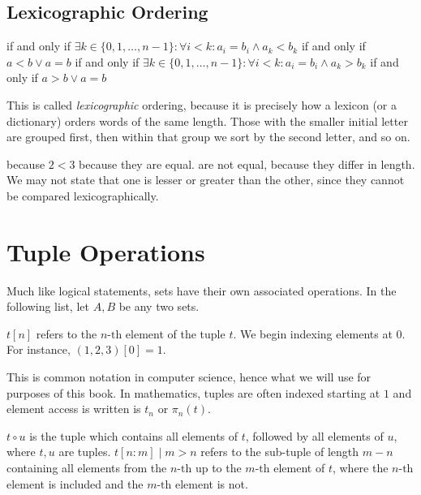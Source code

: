\subsection*{Lexicographic Ordering}
\begin{itemize}
   if and only if
        \(\exists k \in \{0, 1, \dots, n-1\}: \forall i < k: a_{i} = b_{i} \land a_{k} < b_{k}\)
   if and only if \(a < b \lor a = b\)
   if and only if
        \(\exists k \in \{0, 1, \dots, n-1\}: \forall i < k: a_{i} = b_{i} \land a_{k} > b_{k}\)
   if and only if \(a > b \lor a = b\)
\end{itemize}

This is called \emph{lexicographic} ordering, because it is precisely how a
lexicon (or a dictionary) orders words of the same length. Those with the
smaller initial letter are grouped first, then within that group we sort by the
second letter, and so on.

\begin{example}
  \begin{itemize}
    \leavevmode
     because \(2 < 3\)
     because they are equal.
     are not equal, because they differ in
          length. We may not state that one is lesser or greater than the
          other, since they cannot be compared lexicographically.
  \end{itemize}
\end{example}


\section{Tuple Operations}
Much like logical statements, sets have their own associated operations.
In the following list, let \(A, B\) be any two sets.
\begin{itemize}
        \(t[n]\) refers to the \(n\text{-th}\) element of the tuple \(t\).
        We begin indexing elements at \(0\).
        For instance, \((1,2,3)[0] = 1\).
        \begin{remark}
          This is common notation in computer science, hence what we will use for
          purposes of this book. In mathematics, tuples are often indexed starting
          at \(1\) and element access is written is \(t_{n}\) or \(\pi_{n}(t)\).
        \end{remark}
        \(t \circ u\) is the tuple which contains all elements of \(t\),
        followed by all elements of \(u\), where \(t,u\) are tuples.
        \(t[n:m] \mid m > n\) refers to the sub-tuple of length \(m-n\)
        containing all elements from the \(n\text{-th}\) up to the \(m\text{-th}\)
        element of \(t\), where the \(n\text{-th}\) element is included and the
        \(m\text{-th}\) element is not.
\end{itemize}

\begin{example}
  \begin{itemize}
    \leavevmode
\end{itemize}
\end{example}


